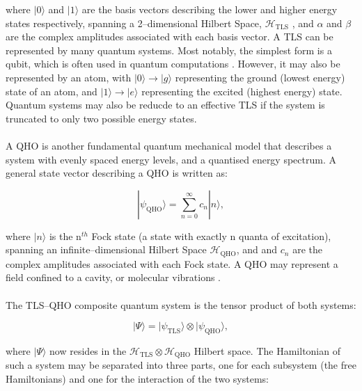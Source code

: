 \documentclass[11pt]{article}
\begin{document}
where $|0\rangle$ and $|1\rangle$ are the basis vectors describing the lower and higher energy states respectively, spanning a 2--dimensional Hilbert Space, $\mathcal{H}_{\scriptscriptstyle \text{TLS}}$ , and $\alpha$ and $\beta$ are the complex amplitudes associated with each basis vector. A TLS can be represented by many quantum systems. Most notably, the simplest form is a qubit, which is often used in quantum computations \cite{TLS2024-qubits}. However, it may also be represented by an atom, with $|0\rangle \rightarrow |g\rangle$ representing the ground (lowest energy) state of an atom, and $|1\rangle \rightarrow |e\rangle$ representing the excited (highest energy) state. Quantum systems may also be reducde to an effective TLS if the system is truncated to only two possible energy states. \\
\\
A QHO is another fundamental quantum mechanical model that describes a system with evenly spaced energy levels, and a quantised energy spectrum. A general state vector describing a QHO is written as:

\begin{equation}
|\psi_{\scriptscriptstyle \text{QHO}}\rangle = \sum_{n=0}^\infty c_n |n\rangle,
\end{equation}

where $|n\rangle$ is the n$^{th}$ Fock state (a state with exactly n quanta of excitation), spanning an infinite--dimensional Hilbert Space $\mathcal{H}_{\scriptscriptstyle \text{QHO}}$, and and $c_n$ are the complex amplitudes associated with each Fock state. A QHO may represent a field confined to a cavity, or molecular vibrations \cite{Context2004-CQED_JCM}.\\
\\
The TLS--QHO composite quantum system is the tensor product of both systems:

\begin{equation}
    |\Psi\rangle = |\psi_{\scriptscriptstyle \text{TLS}}\rangle \otimes |\psi_{\scriptscriptstyle \text{QHO}}\rangle,
\end{equation}

where $|\Psi\rangle$ now resides in the $\mathcal{H}_{\scriptscriptstyle \text{TLS}} \otimes\mathcal{H}_{\scriptscriptstyle \text{QHO}}$ Hilbert space. The Hamiltonian of such a system may be separated into three parts, one for each subsystem (the free Hamiltonians) and one for the interaction of the two systems:
\end{document}
